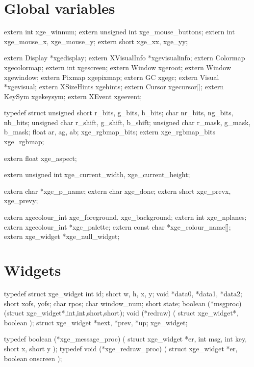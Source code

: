 \section{Global variables}

\begin{listingC}
extern int   xge_winnum;
extern unsigned int xge_mouse_buttons;
extern int   xge_mouse_x, xge_mouse_y;
extern short xge_xx, xge_yy;

extern Display     *xgedisplay;
extern XVisualInfo *xgevisualinfo;
extern Colormap    xgecolormap;
extern int         xgescreen;
extern Window      xgeroot;
extern Window      xgewindow;
extern Pixmap      xgepixmap;
extern GC          xgegc;
extern Visual      *xgevisual;
extern XSizeHints  xgehints;
extern Cursor      xgecursor[];
extern KeySym      xgekeysym;
extern XEvent      xgeevent;

typedef struct {
         unsigned short r_bits,  g_bits,  b_bits;
         char           nr_bits, ng_bits, nb_bits;
         unsigned char  r_shift, g_shift, b_shift;
         unsigned char  r_mask, g_mask, b_mask;
         float          ar, ag, ab;
       } xge_rgbmap_bits;
extern xge_rgbmap_bits xge_rgbmap;

extern float      xge_aspect;

extern unsigned int xge_current_width, xge_current_height;

extern char       *xge_p_name;
extern char       xge_done;
extern short      xge_prevx, xge_prevy;

extern xgecolour_int xge_foreground, xge_background;
extern int           xge_nplanes;
extern xgecolour_int *xge_palette;
extern const char    *xge_colour_name[];
extern xge_widget    *xge_null_widget;
\end{listingC}

\section{Widgets}

\begin{listingC}
typedef struct xge_widget {
          int   id;
          short w, h, x, y;
          void *data0, *data1, *data2;
          short xofs, yofs;
          char  rpos;
          char  window_num;
          short state;
          boolean (*msgproc)(struct xge_widget*,int,int,short,short);
          void (*redraw) ( struct xge_widget*, boolean );
          struct xge_widget *next, *prev, *up;
        } xge_widget;

typedef boolean (*xge_message_proc) ( struct xge_widget *er,
                                  int msg, int key, short x, short y );
typedef void (*xge_redraw_proc) ( struct xge_widget *er,
                                  boolean onscreen );
\end{listingC}


